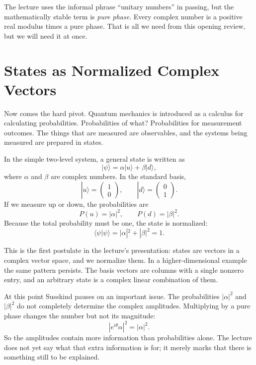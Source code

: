 The lecture uses the informal phrase ``unitary numbers'' in passing, but the mathematically stable term is \emph{pure phase}. Every complex number is a positive real modulus times a pure phase. That is all we need from this opening review, but we will need it at once.

\section{States as Normalized Complex Vectors}

Now comes the hard pivot. Quantum mechanics is introduced as a calculus for calculating probabilities. Probabilities of what? Probabilities for measurement outcomes. The things that are measured are observables, and the systems being measured are prepared in states.

In the simple two-level system, a general state is written as
\begin{equation}
|\psi\rangle=\alpha|u\rangle+\beta|d\rangle,
\end{equation}
where \(\alpha\) and \(\beta\) are complex numbers. In the standard basis,
\begin{equation}
|u\rangle=\begin{pmatrix}1\\0\end{pmatrix},
\qquad
|d\rangle=\begin{pmatrix}0\\1\end{pmatrix}.
\end{equation}
If we measure up or down, the probabilities are
\begin{equation}
P(u)=|\alpha|^2,\qquad P(d)=|\beta|^2.
\end{equation}
Because the total probability must be one, the state is normalized:
\begin{equation}
\langle \psi|\psi\rangle=|\alpha|^2+|\beta|^2=1.
\end{equation}

This is the first postulate in the lecture's presentation: states are vectors in a complex vector space, and we normalize them. In a higher-dimensional example the same pattern persists. The basis vectors are columns with a single nonzero entry, and an arbitrary state is a complex linear combination of them.

At this point Susskind pauses on an important issue. The probabilities \(|\alpha|^2\) and \(|\beta|^2\) do not completely determine the complex amplitudes. Multiplying by a pure phase changes the number but not its magnitude:
\begin{equation}
|e^{i\theta}\alpha|^2=|\alpha|^2.
\end{equation}
So the amplitudes contain more information than probabilities alone. The lecture does not yet say what that extra information is for; it merely marks that there is something still to be explained.

